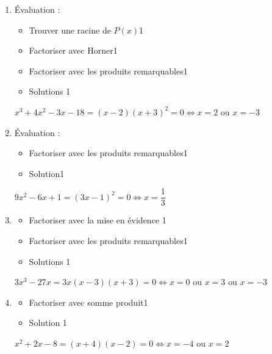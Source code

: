 \documentclass[a4paper, 12pt, parskip=half-]{scrartcl}
\begin{document}
\begin{solution}
    \begin{enumerate}
        \item Évaluation :
              \begin{itemize}
                  \item Trouver une racine de $P(x)$\hfill 1
                  \item Factoriser avec Horner\hfill 1
                  \item Factoriser avec les produits remarquables\hfill 1
                  \item Solutions \hfill 1
              \end{itemize}
              $x^{3}+4x^{2}-3x -18 = (x-2)(x+3)^2=0 \Leftrightarrow x = 2\text{~ou~} x= -3$

        \item Évaluation :
              \begin{itemize}
                  \item Factoriser avec les produits remarquables\hfill 1
                  \item Solution\hfill 1
              \end{itemize}
              $9x^2-6x+1 = (3x-1)^2 =0\Leftrightarrow x = \dfrac{1}{3}$

        \item
              \begin{itemize}
                  \item Factoriser avec la mise en évidence \hfill 1
                  \item Factoriser avec les produits remarquables\hfill 1
                  \item Solutions \hfill 1
              \end{itemize}
              $3x^3-27x = 3x(x-3)(x+3)=0 \Leftrightarrow x=0 \text{~ou~}x=3\text{~ou~}x=-3$

        \item
              \begin{itemize}
                  \item Factoriser avec somme produit\hfill 1
                  \item Solution \hfill 1
              \end{itemize}
              $x^2+2x-8 = (x+4)(x-2) = 0\Leftrightarrow x=-4 \text{~ou~}x=2$
    \end{enumerate}
\end{solution}
\end{document}

